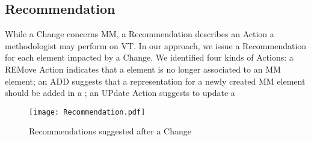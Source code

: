 \subsection{Recommendation}
\label{sec:Suggestion:Recommendation}

While a \textsf{Change} concerns \textsf{MM}, a \textsf{Recommendation} describes
an \textsf{Action} a methodologist may perform on \textsf{VT}. In our approach, we
issue a \textsf{Recommendation} for each \viewtype element impacted by a 
\textsf{Change}. We identified four kinds of \textsf{Action}s: a \textsf{REM}ove
\textsf{Action} indicates that a \viewtype element is no longer associated to an
\textsf{MM} element; an \textsf{ADD} suggests that a representation for a newly 
created \textsf{MM} element should be added in a \viewtype; an \textsf{UP}date
\textsf{Action} suggests to update a 


\begin{figure}[t]
    \centering
    \texttt{[image: Recommendation.pdf]}
    \caption{\textsf{Recommendation}s suggested after a \textsf{Change}}
    \label{fig:Recommendation}
\end{figure}
